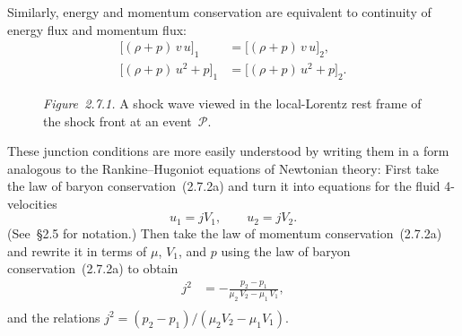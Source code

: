 \noindent
Similarly, energy and momentum conservation are equivalent to continuity of
energy flux and momentum flux:
%
\begin{subequations}
\begin{align}
\tag{2.7.2b}
\bigl[(\rho + p)\,v\,u\bigr]_1
  &= \bigl[(\rho + p)\,v\,u\bigr]_2,\\[4pt]
\tag{2.7.2c}
\bigl[(\rho + p)\,u^2 + p\bigr]_1
  &= \bigl[(\rho + p)\,u^2 + p\bigr]_2.
\end{align}
\end{subequations}


\begin{figure}[htbp]
\centering
\caption{\textit{Figure~2.7.1.}  A shock wave viewed in the local-Lorentz
rest frame of the shock front at an event~$\mathscr{P}$.}
\label{fig:2.7.1}
\end{figure}

These junction conditions are more easily understood by writing them in a
form analogous to the Rankine--Hugoniot equations of Newtonian theory:
First take the law of baryon conservation~(2.7.2a) and turn it into equations
for the fluid 4-velocities
%
\begin{equation}
\tag{2.7.3a}
u_1 = jV_1, \qquad u_2 = jV_2.
\end{equation}
%
(See~\S2.5 for notation.)  Then take the law of momentum conservation~(2.7.2a)
and rewrite it in terms of $\mu$, $V_1$, and $p$ using the law of baryon
conservation~(2.7.2a) to obtain
%
\begin{subequations}
\begin{align}
\tag{2.7.3b}
j^2 &= -\frac{p_2 - p_1}{\mu_2\,V_2 - \mu_1\,V_1},\\[6pt]
\end{align}
\end{subequations}
%
and the relations
$j^2 = (p_2-p_1)/(\mu_2 V_2 - \mu_1 V_1)$.

